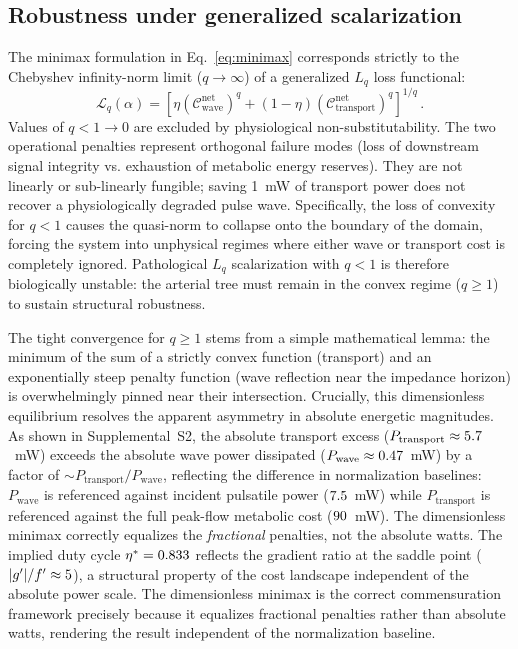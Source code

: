 \documentclass[11pt,a4paper]{article}
\theoremstyle{remark}
\begin{document}
\subsection{Robustness under generalized scalarization}

The minimax formulation in Eq.~\eqref{eq:minimax} corresponds strictly to the
Chebyshev infinity-norm limit ($q \to \infty$) of a generalized $L_q$ loss
functional:
\begin{equation}
   \mathcal{L}_q(\alpha) = \left[ \eta \left(\mathcal{C}^{\mathrm{net}}_{\mathrm{wave}}\right)^q + (1-\eta) \left(\mathcal{C}^{\mathrm{net}}_{\mathrm{transport}}\right)^q \right]^{1/q} \,.
\end{equation}
Values of $q < 1 \to 0$ are excluded by physiological non-substitutability. The
two operational penalties represent orthogonal failure modes (loss of downstream
signal integrity vs. exhaustion of metabolic energy reserves). They are not
linearly or sub-linearly fungible; saving 1~mW of transport power does not
recover a physiologically degraded pulse wave. Specifically, the loss of
convexity for $q < 1$ causes the quasi-norm to collapse onto the boundary of the
domain, forcing the system into unphysical regimes where either wave or
transport cost is completely ignored. Pathological $L_q$ scalarization with $q <
1$ is therefore biologically unstable: the arterial tree must remain in the
convex regime ($q \ge 1$) to sustain structural robustness.

The tight convergence for $q \ge 1$ stems from a simple mathematical lemma: the
minimum of the sum of a strictly convex function (transport) and an
exponentially steep penalty function (wave reflection near the impedance
horizon) is overwhelmingly pinned near their intersection. Crucially, this
dimensionless equilibrium resolves the apparent asymmetry in absolute energetic
magnitudes. As shown in Supplemental~S2, the absolute transport excess
($P_{\mathrm{transport}} \approx 5.7$~mW) exceeds the absolute wave
power dissipated ($P_{\mathrm{wave}} \approx 0.47$~mW) by a factor of
$\sim\!P_{\mathrm{transport}}/P_{\mathrm{wave}}$, reflecting the difference in
normalization baselines: $P_{\mathrm{wave}}$ is referenced against incident
pulsatile power ($7.5$~mW) while $P_{\mathrm{transport}}$ is referenced
against the full peak-flow metabolic cost ($90$~mW). The
dimensionless minimax correctly equalizes the \emph{fractional} penalties, not
the absolute watts. The implied duty cycle $\eta^* = 0.833$ reflects the
gradient ratio at the saddle point ($|g'|/f' \approx 5$), a
structural property of the cost landscape independent of the absolute power
scale. The dimensionless minimax is the correct commensuration framework
precisely because it equalizes fractional penalties rather than absolute watts,
rendering the result independent of the normalization baseline.
\end{document}
